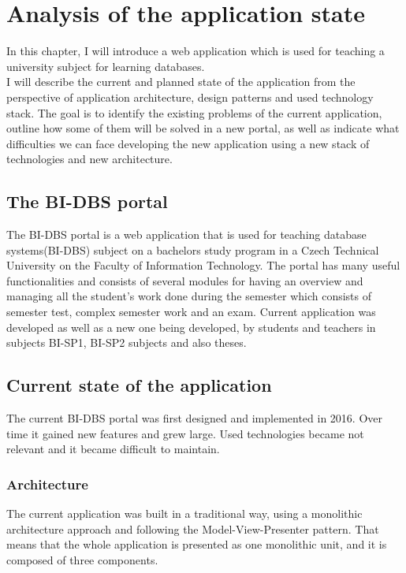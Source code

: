 \chapter{Analysis of the application state}

In this chapter, I will introduce a web application which is used for teaching a university subject for learning databases. \\
I will describe the current and planned state of the application from the perspective of application architecture, design patterns and used technology stack. The goal is to identify the existing problems of the current application, outline how some of them will be solved in a new portal, as well as indicate what difficulties we can face developing the new application using a new stack of technologies and new architecture.

\section{The BI-DBS portal}
The BI-DBS portal is a web application that is used for teaching database systems(BI-DBS) subject on a bachelors study program in a Czech Technical University on the Faculty of Information Technology. The portal has many useful functionalities and consists of several modules for having an overview and managing all the student's work done during the semester which consists of semester test, complex semester work and an exam. 
Current application was developed as well as a new one being developed, by students and teachers in subjects BI-SP1, BI-SP2 subjects and also theses.


\section{Current state of the application}
The current BI-DBS portal was first designed and implemented in 2016. Over time it gained new features and grew large. Used technologies became not relevant and it became difficult to maintain. 

\subsection{Architecture}
The current application was built in a traditional way, using a monolithic architecture approach and following the Model-View-Presenter pattern\cite{potel_mvp}. That means that the whole application is presented as one monolithic unit, and it is composed  of three components.

